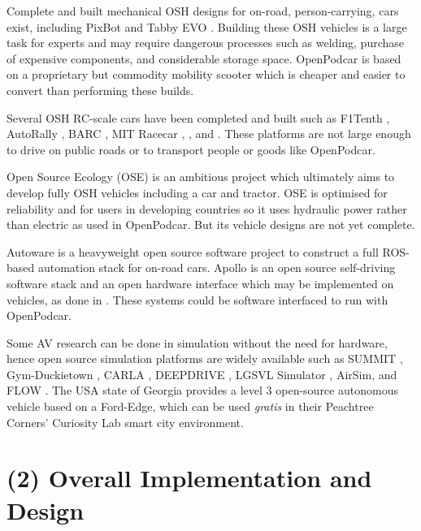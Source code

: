 \documentclass[a4paper]{article}
\begin{document}
	Complete and built mechanical OSH designs for on-road, person-carrying, cars exist, including PixBot \cite{pixmovingpixbot} and Tabby EVO \cite{openmotorstabby}. Building these OSH vehicles is a large task for experts and may require dangerous processes such as welding, purchase of expensive components, and considerable storage space. OpenPodcar is based on a proprietary but commodity mobility scooter which is cheaper and easier to convert than performing these builds.
	
	Several OSH RC-scale cars have been completed and built such as F1Tenth \cite{f1tenth}, AutoRally \cite{goldfain2019autorally}, BARC \cite{gonzales2018planning}, MIT Racecar \cite{mit}, \cite{nakamoto2019development}, and \cite{vincke2021open}. These platforms are not large enough to drive on public roads or to transport people or goods like OpenPodcar.
	
	Open Source Ecology (OSE) \cite{jakubowski2003open} is an ambitious project which ultimately aims to develop fully OSH vehicles including a car and tractor. OSE is optimised for reliability and for users in developing countries so it uses hydraulic power rather than electric as used in OpenPodcar. But its vehicle designs are not yet complete.
	
	Autoware \cite{kato2018autoware} is a heavyweight open source software project to construct a full ROS-based automation stack for on-road cars. Apollo \cite{apolloautoapollo} is an open source self-driving software stack and an open hardware interface which may be implemented on vehicles, as done in \cite{kessler2019bridging}. These systems could be software interfaced to run with OpenPodcar.
	
	Some AV research can be done in simulation without the need for hardware, hence open source simulation platforms are widely available such as SUMMIT \cite{cai2020summit}, Gym-Duckietown \cite{chevalier-boisvert2018duckietown}, CARLA \cite{dosovitskiy2017carla}, DEEPDRIVE \cite{quiterdeepdrive}, LGSVL Simulator \cite{rong2020lgsvl}, AirSim\cite{shah2017airsim}, and FLOW \cite{wu2017flow}. The USA state of Georgia provides a level 3 open-source autonomous vehicle based on a Ford-Edge\cite{peachtreecuriosity}, which can be used {\em gratis} in their Peachtree Corners' Curiosity Lab smart city environment.
	
	\section{(2) Overall Implementation and Design}\label{h.1u7vph94gfbt}
	
\end{document}

